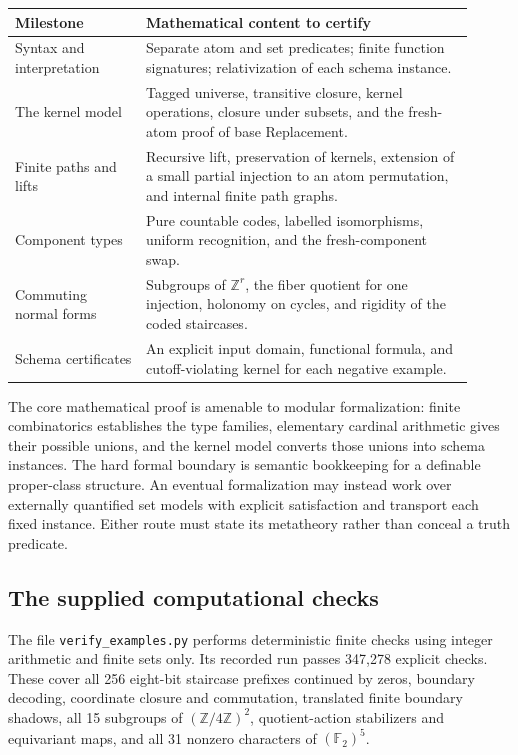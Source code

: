 \documentclass[11pt,letterpaper]{article}
\numberwithin{equation}{section}
\theoremstyle{plain}
\theoremstyle{definition}
\theoremstyle{remark}
\newcommand{\ZZ}{\mathbb Z}
\newcommand{\FF}{\mathbb F}
\begin{document}
\begin{center}
\begin{tabular}{@{}L{0.26\linewidth}L{0.65\linewidth}@{}}
\toprule
Milestone & Mathematical content to certify \\
\midrule
Syntax and interpretation & Separate atom and set predicates; finite function signatures; relativization of each schema instance. \\[5pt]
The kernel model & Tagged universe, transitive closure, kernel operations, closure under subsets, and the fresh-atom proof of base Replacement. \\[5pt]
Finite paths and lifts & Recursive lift, preservation of kernels, extension of a small partial injection to an atom permutation, and internal finite path graphs. \\[5pt]
Component types & Pure countable codes, labelled isomorphisms, uniform recognition, and the fresh-component swap. \\[5pt]
Commuting normal forms & Subgroups of $\ZZ^r$, the fiber quotient for one injection, holonomy on cycles, and rigidity of the coded staircases. \\[5pt]
Schema certificates & An explicit input domain, functional formula, and cutoff-violating kernel for each negative example. \\
\bottomrule
\end{tabular}
\end{center}

The core mathematical proof is amenable to modular formalization: finite combinatorics establishes the type families, elementary cardinal arithmetic gives their possible unions, and the kernel model converts those unions into schema instances. The hard formal boundary is semantic bookkeeping for a definable proper-class structure. An eventual formalization may instead work over externally quantified set models with explicit satisfaction and transport each fixed instance. Either route must state its metatheory rather than conceal a truth predicate.

\subsection{The supplied computational checks}

The file \texttt{verify\_examples.py} performs deterministic finite checks using integer arithmetic and finite sets only. Its recorded run passes 347,278 explicit checks. These cover all 256 eight-bit staircase prefixes continued by zeros, boundary decoding, coordinate closure and commutation, translated finite boundary shadows, all 15 subgroups of $(\ZZ/4\ZZ)^2$, quotient-action stabilizers and equivariant maps, and all 31 nonzero characters of $(\FF_2)^5$.
\end{document}
